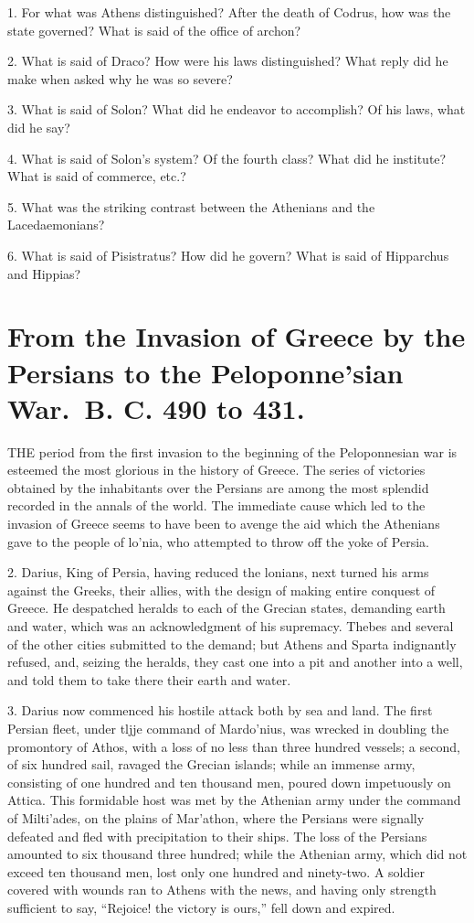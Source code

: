 \documentclass[openany,a4paper]{memoir}
\begin{document}
1. For what was Athens distinguished? After the 
death of Codrus, how was the state governed? What is said of the 
office of archon? 

2. What is said of Draco? How were his laws distinguished? What reply did he make when asked why he was so severe? 

3. What is said of Solon? What did he endeavor to accomplish? 
Of his laws, what did he say? 

4. What is said of Solon's system? Of 
the fourth class? What did he institute? What is said of commerce, 
etc.?

5. What was the striking contrast between the Athenians and the 
Lacedaemonians? 

6. What is said of Pisistratus? How did he govern? What is said 
of Hipparchus and Hippias? 



\chapter{From the Invasion of Greece by the Persians to the Peloponne'sian War.~B. C. 490 to 431.} 

THE period from the first invasion to the beginning of the 
Peloponnesian war is esteemed the most glorious in the 
history of Greece. The series of victories obtained by the 
inhabitants over the Persians are among the most splendid 
recorded in the annals of the world. The immediate cause 
which led to the invasion of Greece seems to have been to 
avenge the aid which the Athenians gave to the people of 
lo'nia, who attempted to throw off the yoke of Persia. 

2. Darius, King of Persia, having reduced the lonians, next 
turned his arms against the Greeks, their allies, with the design 
of making entire conquest of Greece. He despatched heralds 
to each of the Grecian states, demanding earth and water, 
which was an acknowledgment of his supremacy. Thebes 
and several of the other cities submitted to the demand; but 
Athens and Sparta indignantly refused, and, seizing the 
heralds, they cast one into a pit and another into a well, and 
told them to take there their earth and water. 

3. Darius now commenced his hostile attack both by sea 
and land. The first Persian fleet, under tljje command of 
Mardo'nius, was wrecked in doubling the promontory of 
Athos, with a loss of no less than three hundred vessels; a 
second, of six hundred sail, ravaged the Grecian islands; 
while an immense army, consisting of one hundred and ten 
thousand men, poured down impetuously on Attica. This 
formidable host was met by the Athenian army under the 
command of Milti'ades, on the plains of Mar'athon, where 
the Persians were signally defeated and fled with precipitation to their ships. The loss of the Persians amounted to 
six thousand three hundred; while the Athenian army, which 
did not exceed ten thousand men, lost only one hundred and 
ninety-two. A soldier covered with wounds ran to Athens 
with the news, and having only strength sufficient to say, 
``Rejoice! the victory is ours,'' fell down and expired. 
\end{document}
